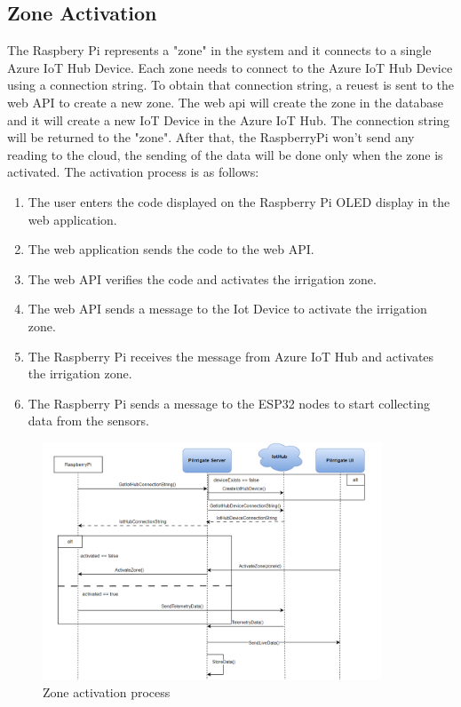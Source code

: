 \subsection{Zone Activation}
The Raspbery Pi represents a "zone" in the system and it connects to a single Azure IoT Hub Device. Each zone needs to
connect to the Azure IoT Hub Device using a connection string. To obtain that connection string, a reuest is sent 
to the web API to create a new zone. The web api will create the zone in the database and it will create a new IoT Device
in the Azure IoT Hub. The connection string will be returned to the "zone". After that, the RaspberryPi won't send any 
reading to the cloud, the sending of the data will be done only when the zone is activated.
The activation process is as follows:
\begin{enumerate}
    \item The user enters the code displayed on the Raspberry Pi OLED display in the web application.
    \item The web application sends the code to the web API.
    \item The web API verifies the code and activates the irrigation zone.
    \item The web API sends a message to the Iot Device to activate the irrigation zone.
    \item The Raspberry Pi receives the message from Azure IoT Hub and activates the irrigation zone.
    \item The Raspberry Pi sends a message to the ESP32 nodes to start collecting data from the sensors.
\end{enumerate}

\begin{figure}[H]
    \centering
    \includegraphics[width=0.9\textwidth]{images/activation.png}
    \caption{Zone activation process}
    \label{fig:zone-activation}
\end{figure}

